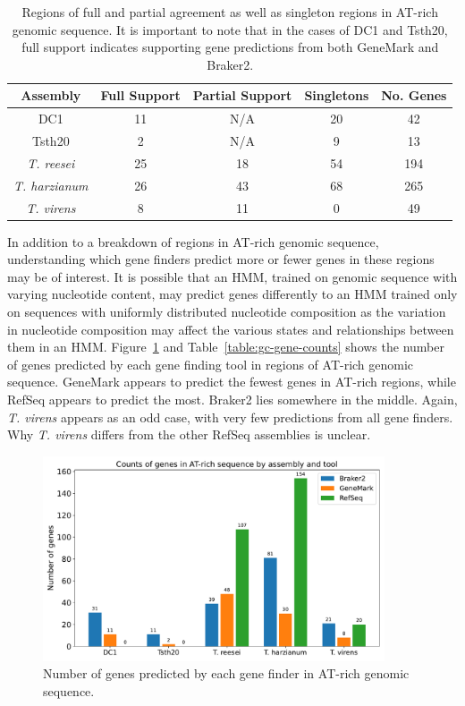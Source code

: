 \begin{table}
  \begin{center}
    \begin{tabular}{|c|c|c|c|c|}
      \hline
      Assembly & Full Support & Partial Support & Singletons & No. Genes \\ \hline
      DC1 & 11 & N/A & 20 & 42  \\ \hline
      Tsth20 & 2 & N/A & 9 & 13  \\ \hline
      \textit{T. reesei} & 25 & 18 & 54 & 194  \\ \hline
      \textit{T. harzianum} & 26 & 43 & 68 & 265  \\ \hline
      \textit{T. virens} & 8 & 11 & 0 & 49  \\ \hline
    \end{tabular}
  \end{center}
  \caption[Agreement of gene predictions in AT-rich regions]{Regions of full and partial agreement as well as singleton regions in AT-rich genomic sequence. It is important to note that in the cases of DC1 and Tsth20, full support indicates supporting gene predictions from both GeneMark and Braker2.}\label{table:gc-regions}
\end{table}

In addition to a breakdown of regions in AT-rich genomic sequence,
understanding which gene finders predict more or fewer genes in these
regions may be of interest. It is possible that an HMM, trained on
genomic sequence with varying nucleotide content, may predict genes
differently to an HMM trained only on sequences with uniformly
distributed nucleotide composition as the variation in nucleotide
composition may affect the various states and relationships between
them in an HMM. Figure~\ref{fig:gc-gene-counts} and Table~\ref{table:gc-gene-counts} shows the number of
genes predicted by each gene finding tool in regions of AT-rich
genomic sequence. GeneMark appears to predict the fewest genes in
AT-rich regions, while RefSeq appears to predict the most. Braker2
lies somewhere in the middle. Again, \textit{T. virens} appears as an
odd case, with very few predictions from all gene finders. Why
\textit{T. virens} differs from the other RefSeq assemblies is
unclear.

\begin{figure}
  \centering
  \includegraphics[width=0.90\textwidth]{figures/atrich-genes-barplot.pdf}
  \caption[Gene counts in AT-rich regions]{Number of genes predicted by each gene finder in AT-rich genomic sequence.}\label{fig:gc-gene-counts}
\end{figure}

